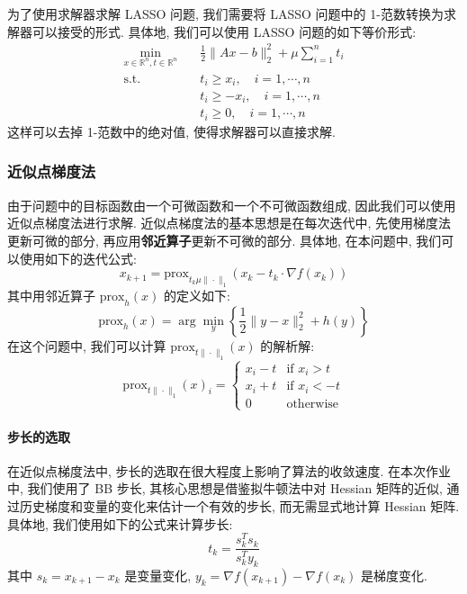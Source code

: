 \documentclass{article}
\begin{document}
为了使用求解器求解 LASSO 问题, 我们需要将 LASSO 问题中的 1-范数转换为求解器可以接受的形式. 具体地, 我们可以使用 LASSO 问题的如下等价形式:
\begin{align*}
    \min_{x \in \mathbb{R}^n, t \in \mathbb{R}^n}\quad & \frac{1}{2} \|Ax - b\|_2^2 + \mu \sum_{i=1}^n t_i \\
    \text{s.t.}\quad & t_i \geq x_i, \quad i=1,\cdots,n\\
    & t_i \geq -x_i, \quad i=1,\cdots,n\\
    & t_i \geq 0, \quad i=1,\cdots,n
\end{align*}
这样可以去掉 1-范数中的绝对值, 使得求解器可以直接求解.

\subsubsection{近似点梯度法}

由于问题中的目标函数由一个可微函数和一个不可微函数组成, 因此我们可以使用近似点梯度法进行求解. 近似点梯度法的基本思想是在每次迭代中, 先使用梯度法更新可微的部分, 再应用\textbf{邻近算子}更新不可微的部分. 具体地, 在本问题中, 我们可以使用如下的迭代公式:
\begin{equation*}
    x_{k+1} = \text{prox}_{t_k\mu\|\cdot\|_1}(x_k - t_k \cdot \nabla f(x_k))
\end{equation*}
其中用邻近算子 $\text{prox}_h(x)$ 的定义如下:
\begin{equation*}
    \text{prox}_h(x) = \arg\min_y \left\{\frac{1}{2}\|y - x\|_2^2 + h(y)
    \right\}
\end{equation*}
在这个问题中, 我们可以计算 $\text{prox}_{t\|\cdot\|_1}(x)$ 的解析解:
\begin{equation*}
    \text{prox}_{t\|\cdot\|_{1}}(x)_i =
    \begin{cases}
        x_i - t & \text{if } x_i > t\\
        x_i + t & \text{if } x_i < -t\\
        0 & \text{otherwise}
    \end{cases}
\end{equation*}

\paragraph{步长的选取}

在近似点梯度法中, 步长的选取在很大程度上影响了算法的收敛速度. 在本次作业中, 我们使用了 BB 步长, 其核心思想是借鉴拟牛顿法中对 Hessian 矩阵的近似, 通过历史梯度和变量的变化来估计一个有效的步长, 而无需显式地计算 Hessian 矩阵. 具体地, 我们使用如下的公式来计算步长:
\begin{equation*}
    t_{k} = \frac{s_k^T s_k}{s_k^T y_k}
\end{equation*}
其中 $s_k = x_{k+1} - x_k$ 是变量变化, $y_k = \nabla f(x_{k+1}) - \nabla f(x_k)$ 是梯度变化.
\end{document}
